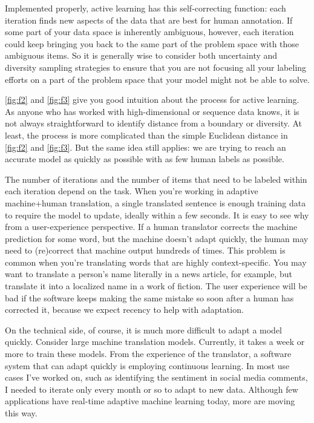 \documentclass[sigconf,nonacm,screen,pbalance]{acmart}
\begin{document}
Implemented
properly, active learning has this self-correcting function: each iteration finds new
aspects of the data that are best for human annotation. If some part of your data space
is inherently ambiguous, however, each iteration could keep bringing you back to the
same part of the problem space with those ambiguous items. So it is generally wise to
consider both uncertainty and diversity sampling strategies to ensure that you are not
focusing all your labeling efforts on a part of the problem space that your model might
not be able to solve.

\autoref{fig:f2} and \ref{fig:f3} give you good intuition about the process for active learning. As anyone who
has worked with high-dimensional or sequence data knows, it is not always
straightforward to identify distance from a boundary or diversity. At least, the process
is more complicated than the simple Euclidean distance in \autoref{fig:f2} and \ref{fig:f3}. But the
same idea still applies: we are trying to reach an accurate model as quickly as possible
with as few human labels as possible.

The
number of iterations and the number of items that need to be labeled within each
iteration depend on the task. When you're working in adaptive machine+human translation,
a single translated sentence is enough training data to require the model to update,
ideally within a few seconds. It is easy to see why from a user-experience perspective.
If a human translator corrects the machine prediction for some word, but the machine
doesn't adapt quickly, the human may need to (re)correct that machine output hundreds of
times. This problem is common when you're translating words that are highly
context-specific. You may want to translate a person's name literally in a news article,
for example, but translate it into a localized name in a work of fiction. The user
experience will be bad if the software keeps making the same mistake so soon after a
human has corrected it, because we expect recency to help with adaptation.

On
the technical side, of course, it is much more difficult to adapt a model quickly.
Consider large machine translation models. Currently, it takes a week or more to train
these models. From the experience of the translator, a software system that can adapt
quickly is employing continuous learning. In most use cases I've worked on, such as
identifying the sentiment in social media comments, I needed to iterate only every month
or so to adapt to new data. Although few applications have real-time adaptive machine
learning today, more are moving this way.
\end{document}
